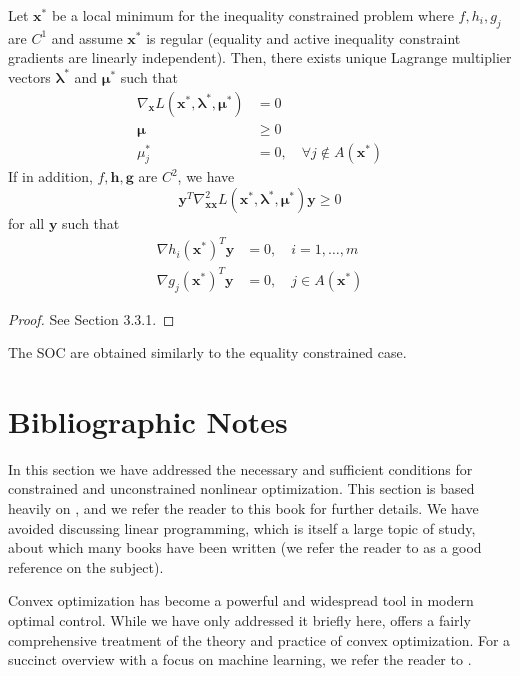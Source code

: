 \begin{theorem}
Let $\bm{x}^*$ be a local minimum for the inequality constrained problem where $f, h_i, g_j$ are $C^1$ and assume $\bm{x}^*$ is regular (equality and active inequality constraint gradients are linearly independent). Then, there exists unique Lagrange multiplier vectors $\bm{\lambda}^*$ and $\bm{\mu}^*$ such that
\begin{align}
    \nabla_{\bm{x}} L(\bm{x}^*,\bm{\lambda}^*, \bm{\mu}^*) &= 0\\
    \bm{\mu} &\geq 0\\
    \mu_j^* &= 0, \quad \forall j \notin A(\bm{x}^*)
\end{align}
If in addition, $f,\bm{h},\bm{g}$ are $C^2$, we have 
\begin{equation}
    \bm{y}^T \nabla^2_{\bm{xx}} L(\bm{x}^*,\bm{\lambda}^*, \bm{\mu}^*) \bm{y} \geq 0 
\end{equation}
for all $\bm{y}$ such that 
\begin{align}
    \nabla h_i(\bm{x}^*)^T \bm{y} &=0, \quad i = 1, \ldots, m\\
    \nabla g_j(\bm{x}^*)^T \bm{y} &=0, \quad j \in A(\bm{x}^*)
\end{align}
\end{theorem}

\begin{proof}
See \cite{bertsekas2016nonlinear} Section 3.3.1.
\end{proof}

The SOC are obtained similarly to the equality constrained case. 



\section{Bibliographic Notes}

In this section we have addressed the necessary and sufficient conditions for constrained and unconstrained nonlinear optimization. This section is based heavily on \cite{bertsekas2016nonlinear}, and we refer the reader to this book for further details. We have avoided discussing linear programming, which is itself a large topic of study, about which many books have been written (we refer the reader to \cite{bertsimas1997introduction} as a good reference on the subject). 

Convex optimization has become a powerful and widespread tool in modern optimal control. While we have only addressed it briefly here, \cite{boyd2004convex} offers a fairly comprehensive treatment of the theory and practice of convex optimization. For a succinct overview with a focus on machine learning, we refer the reader to \cite{kolter2008convex}.
